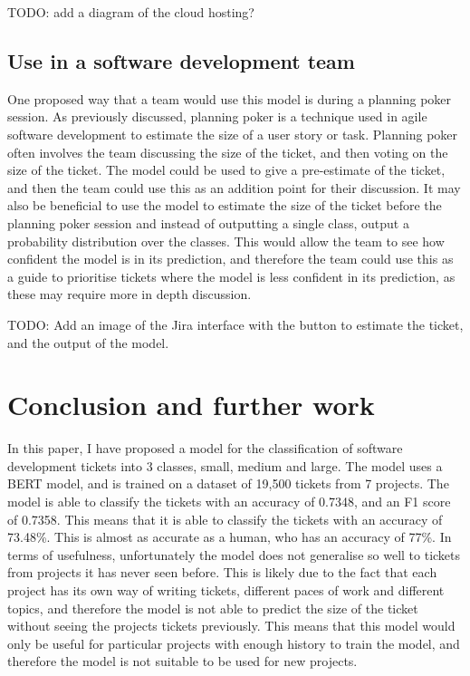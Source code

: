\documentclass{UoYCSproject}
\begin{document}
TODO: add a diagram of the cloud hosting?

    \section[Use in a software development team]{Use in a software development team}
    One proposed way that a team would use this model is during a planning poker session.
    As previously discussed, planning poker is a technique used in agile software development to estimate the size of a user story or task.
Planning poker often involves the team discussing the size of the ticket, and then voting on the size of the ticket.
    The model could be used to give a pre-estimate of the ticket, and then the team could use this as an addition point for their discussion.
It may also be beneficial to use the model to estimate the size of the ticket before the planning poker session and instead of outputting a single class, output a probability distribution over the classes. This would allow the team to see how confident the model is in its prediction, and therefore the team could use this as a guide to prioritise tickets where the model is less confident in its prediction, as these may require more in depth discussion.

TODO: Add an image of the Jira interface with the button to estimate the ticket, and the output of the model.


    \chapter{Conclusion and further work}
    \label{ch:conclusion}

    In this paper, I have proposed a model for the classification of software development tickets into 3 classes, small, medium and large.
    The model uses a BERT model, and is trained on a dataset of 19,500 tickets from 7 projects.
    The model is able to classify the tickets with an accuracy of 0.7348, and an F1 score of 0.7358.
    This means that it is able to classify the tickets with an accuracy of 73.48\%. This is almost as accurate as a human, who has an accuracy of 77\%. In terms of usefulness, unfortunately the model does not generalise so well to tickets from projects it has never seen before. This is likely due to the fact that each project has its own way of writing tickets, different paces of work and different topics, and therefore the model is not able to predict the size of the ticket without seeing the projects tickets previously.
    This means that this model would only be useful for particular projects with enough history to train the model, and therefore the model is not suitable to be used for new projects.
\end{document}
